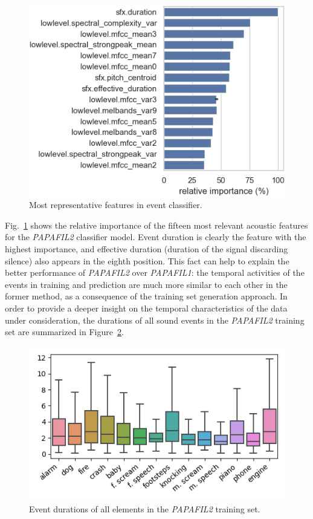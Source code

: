 \begin{figure}[t]
  \centering
  \centerline{\includegraphics[width=\columnwidth]{Figures/SELD/importance_new_tight.png}}
  \caption{Most representative features in event classifier.}
  \label{fig:importance}
\end{figure}

Fig.~\ref{fig:importance} shows the relative importance of the fifteen most relevant acoustic features for the \textit{PAPAFIL2} classifier model.
Event duration is clearly the feature with the highest importance, and effective duration (duration of the signal discarding silence) also appears in the eighth position.
This fact can help to explain the better performance of \textit{PAPAFIL2} over \textit{PAPAFIL1}: the temporal activities of the events in training and prediction are much more similar to each other in the former method, as a consequence of the training set generation approach. 
In order to provide a deeper insight on the temporal characteristics of the data under consideration, the durations of all sound events in the \textit{PAPAFIL2} training set are summarized in Figure~\ref{fig:eventdurations}. 

\begin{figure}[t]
  \centering
  \centerline{\includegraphics[width=\columnwidth]{Figures/SELD/event_durations.png}}
  \caption{Event durations of all elements in the \textit{PAPAFIL2} training set.}
  \label{fig:eventdurations}
\end{figure}


